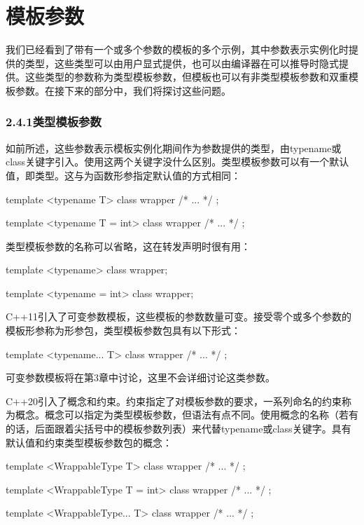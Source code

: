 \section{模板参数}

我们已经看到了带有一个或多个参数的模板的多个示例，其中参数表示实例化时提供的类型，这些类型可以由用户显式提供，也可以由编译器在可以推导时隐式提供。这些类型的参数称为类型模板参数，但模板也可以有非类型模板参数和双重模板参数。在接下来的部分中，我们将探讨这些问题。

\subsubsection{2.4.1\hspace{0.2cm}类型模板参数}

如前所述，这些参数表示模板实例化期间作为参数提供的类型，由typename或class关键字引入。使用这两个关键字没什么区别。类型模板参数可以有一个默认值，即类型。这与为函数形参指定默认值的方式相同：

\begin{cpp}
template <typename T>
class wrapper { /* ... */ };

template <typename T = int>
class wrapper { /* ... */ };
\end{cpp}

类型模板参数的名称可以省略，这在转发声明时很有用：

\begin{cpp}
template <typename>
class wrapper;

template <typename = int>
class wrapper;
\end{cpp}

C++11引入了可变参数模板，这些模板的参数数量可变。接受零个或多个参数的模板形参称为形参包，类型模板参数包具有以下形式：

\begin{cpp}
template <typename... T>
class wrapper { /* ... */ };
\end{cpp}

可变参数模板将在第3章中讨论，这里不会详细讨论这类参数。

C++20引入了概念和约束。约束指定了对模板参数的要求，一系列命名的约束称为概念。概念可以指定为类型模板参数，但语法有点不同。使用概念的名称（若有的话，后面跟着尖括号中的模板参数列表）来代替typename或class关键字。具有默认值和约束类型模板参数包的概念：

\begin{cpp}
template <WrappableType T>
class wrapper { /* ... */ };

template <WrappableType T = int>
class wrapper { /* ... */ };

template <WrappableType... T>
class wrapper { /* ... */ };
\end{cpp}

